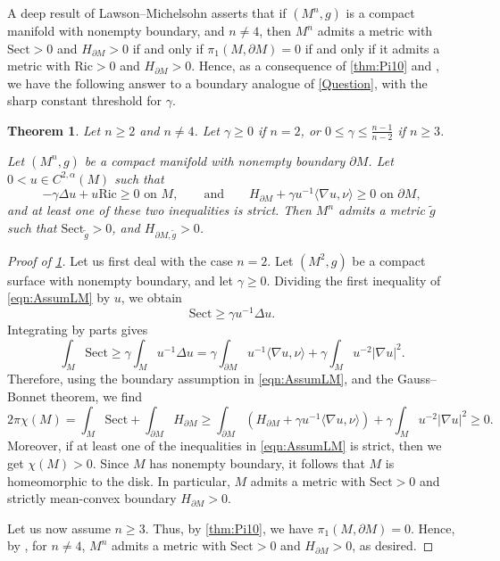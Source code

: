 \documentclass[12pt,a4paper,reqno]{amsart}
\newtheorem{theorem}{Theorem}
\theoremstyle{definition}
\renewcommand{\leq}{\leqslant}
\renewcommand{\geq}{\geqslant}
\renewcommand{\tilde}{\widetilde}
\begin{document}
A deep result of Lawson--Michelsohn \cite[Theorem 1.1]{LawsonMichelsohn} asserts that if $(M^n,g)$ is a compact manifold with nonempty boundary, and $n\neq 4$, then $M^n$ admits a metric with $\mathrm{Sect}>0$ and $H_{\partial M}>0$ if and only if $\pi_1(M,\partial M)=0$ if and only if it admits a metric with $\mathrm{Ric}>0$ and $H_{\partial M}>0$. 
Hence, as a consequence of \cref{thm:Pi10} and \cite[Theorem 1.1]{LawsonMichelsohn}, we have the following answer to a boundary analogue of \cref{Question}, with the sharp constant threshold for $\gamma$.

\begin{theorem}\label{thm:MainThmIntro}
    Let $n\geq 2$ and $n\neq 4$. Let $\gamma\geq 0$ if $n=2$, or $0\leq \gamma\leq \frac{n-1}{n-2}$ if $n\geq 3$. 
    
    Let $(M^n,g)$ be a compact manifold with nonempty  boundary $\partial M$. Let $0<u\in C^{2,\alpha}(M)$ such that
    \begin{equation}\label{eqn:AssumLM}
    -\gamma\Delta u + u\mathrm{Ric}\geq 0\,\, \text{on $M$}, \qquad \text{and} \qquad H_{\partial M} + \gamma u^{-1}\langle\nabla u,\nu\rangle\geq 0\,\, \text{on $\partial M$},
    \end{equation}
    and at least one of these two inequalities is strict. Then $M^n$ admits a metric $\tilde g$ such that $\mathrm{Sect}_{\tilde g}>0$, and $H_{\partial M,\tilde g}>0$.
\end{theorem}
\begin{proof}[Proof of \cref{thm:MainThmIntro}]
Let us first deal with the case \(n=2\). Let \((M^2,g)\) be a compact surface
with nonempty boundary, and let \(\gamma\geq 0\). 
Dividing the first inequality of \eqref{eqn:AssumLM} by \(u\), we obtain
\[
\mathrm{Sect}\geq \gamma u^{-1}\Delta u .
\]
Integrating by parts gives
\[
\int_M \mathrm{Sect}
\geq
\gamma\int_M u^{-1}\Delta u
=
\gamma\int_{\partial M} u^{-1}\langle\nabla u,\nu\rangle
+
\gamma\int_M u^{-2}|\nabla u|^2 .
\]
Therefore, using the boundary assumption in \eqref{eqn:AssumLM}, and the Gauss--Bonnet theorem, we find
\[
2\pi\chi(M)=\int_M \mathrm{Sect}+\int_{\partial M}H_{\partial M}
\geq
\int_{\partial M}
\left(
H_{\partial M}+\gamma u^{-1}\langle\nabla u,\nu\rangle
\right)
+
\gamma\int_M u^{-2}|\nabla u|^2\geq 0.
\]
Moreover, if at least one of the inequalities in
\eqref{eqn:AssumLM} is strict, then we get \(\chi(M)>0\). Since \(M\) has nonempty boundary, it follows that
\(M\) is homeomorphic to the disk. In particular, \(M\) admits a metric with
\(\mathrm{Sect}>0\) and strictly mean-convex boundary \(H_{\partial M}>0\).

Let us now assume $n\geq 3$. Thus, by \cref{thm:Pi10}, we have $\pi_1(M,\partial M)=0$. Hence, by \cite[Theorem 1.1]{LawsonMichelsohn}, for $n \neq 4$, $M^n$ admits a metric with $\mathrm{Sect}>0$ and $H_{\partial M}>0$, as desired.
\end{proof}
\end{document}
